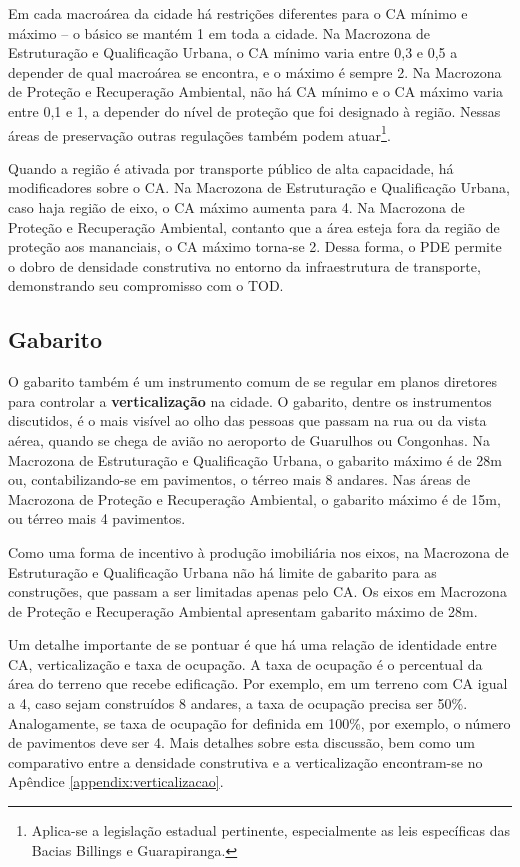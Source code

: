 Em cada macroárea da cidade há restrições diferentes para o CA mínimo e máximo -- o básico se mantém 1 em toda a cidade. Na Macrozona de Estruturação e Qualificação Urbana, o CA mínimo varia entre 0,3 e 0,5 a depender de qual macroárea se encontra, e o máximo é sempre 2. Na Macrozona de Proteção e Recuperação Ambiental, não há CA mínimo e o CA máximo varia entre 0,1 e 1, a depender do nível de proteção que foi designado à região. Nessas áreas de preservação outras regulações também podem atuar\footnote{Aplica-se a legislação estadual pertinente, especialmente as leis específicas das Bacias Billings e Guarapiranga.}.

Quando a região é ativada por transporte público de alta capacidade, há modificadores sobre o CA. Na Macrozona de Estruturação e Qualificação Urbana, caso haja região de eixo, o CA máximo aumenta para 4. Na Macrozona de Proteção e Recuperação Ambiental, contanto que a área esteja fora da região de proteção aos mananciais, o CA máximo torna-se 2. Dessa forma, o PDE permite o dobro de densidade construtiva no entorno da infraestrutura de transporte, demonstrando seu compromisso com o TOD.

\subsection*{Gabarito}

O gabarito também é um instrumento comum de se regular em planos diretores para controlar a \textbf{verticalização} na cidade. O gabarito, dentre os instrumentos discutidos, é o mais visível ao olho das pessoas que passam na rua ou da vista aérea, quando se chega de avião no aeroporto de Guarulhos ou Congonhas. Na Macrozona de Estruturação e Qualificação Urbana, o gabarito máximo é de 28m ou, contabilizando-se em pavimentos, o térreo mais 8 andares. Nas áreas de Macrozona de Proteção e Recuperação Ambiental, o gabarito máximo é de 15m, ou térreo mais 4 pavimentos.

Como uma forma de incentivo à produção imobiliária nos eixos, na Macrozona de Estruturação e Qualificação Urbana não há limite de gabarito para as construções, que passam a ser limitadas apenas pelo CA. Os eixos em Macrozona de Proteção e Recuperação Ambiental apresentam gabarito máximo de 28m.

Um detalhe importante de se pontuar é que há uma relação de identidade entre CA, verticalização e taxa de ocupação. A taxa de ocupação é o percentual da área do terreno que recebe edificação. Por exemplo, em um terreno com CA igual a 4, caso sejam construídos 8 andares, a taxa de ocupação precisa ser 50\%. Analogamente, se taxa de ocupação for definida em 100\%, por exemplo, o número de pavimentos deve ser 4. Mais detalhes sobre esta discussão, bem como um comparativo entre a densidade construtiva e a verticalização encontram-se no Apêndice \ref{appendix:verticalizacao}.


